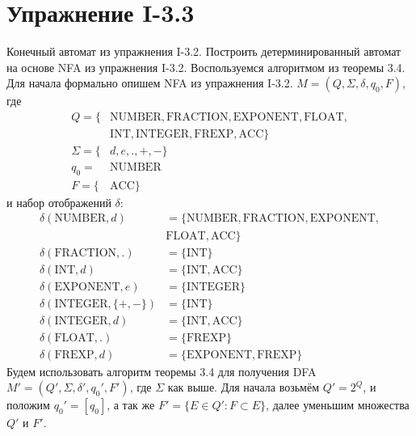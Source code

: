 \documentclass[12pt, oneside]{memoir}
\begin{document}
\section*{Упражнение I-3.3}
\begin{solution}
    {Конечный автомат из упражнения I-3.2.}
    {Построить детерминированный автомат на основе NFA из упражнения I-3.2.}
    {Воспользуемся алгоритмом из теоремы 3.4.}
    Для начала формально опишем NFA из упражнения I-3.2.
    $M = (Q, \Sigma, \delta, q_0, F)$, где
    \begin{align*}
        Q = \{          & \mathrm{NUMBER}, \mathrm{FRACTION}, \mathrm{EXPONENT}, \mathrm{FLOAT}, \\
                        & \mathrm{INT}, \mathrm{INTEGER}, \mathrm{FREXP}, \mathrm{ACC}\}         \\
        \Sigma = \{     & d, e, ., +, -\}                                                        \\
        q_0         ={} & \mathrm{NUMBER}                                                        \\
        F = \{          & \mathrm{ACC}\}
    \end{align*}
    и набор отображений $\delta$:
    \begin{align*}
        \delta(\mathrm{NUMBER}, d)         & = \{\mathrm{NUMBER}, \mathrm{FRACTION}, \mathrm{EXPONENT}, \\
                                           & \mathrm{FLOAT},  \mathrm{ACC}\}                            \\
        \delta(\mathrm{FRACTION}, .)       & = \{\mathrm{INT}\}                                         \\
        \delta(\mathrm{INT}, d)            & = \{\mathrm{INT}, \mathrm{ACC}\}                           \\
        \delta(\mathrm{EXPONENT}, e)       & = \{\mathrm{INTEGER} \}                                    \\
        \delta(\mathrm{INTEGER}, \{+, -\}) & = \{\mathrm{INT}\}                                         \\
        \delta(\mathrm{INTEGER}, d)        & = \{\mathrm{INT}, \mathrm{ACC}\}                           \\
        \delta(\mathrm{FLOAT}, .)          & = \{\mathrm{FREXP}\}                                       \\
        \delta(\mathrm{FREXP}, d)          & = \{\mathrm{EXPONENT}, \mathrm{FREXP}\}
    \end{align*}
    Будем использовать алгоритм теоремы 3.4 для получения DFA $M' = (Q', \Sigma, \delta', q_0', F')$, где $\Sigma$ как выше.
    Для начала возьмём $Q' = 2^Q$, и положим $q_0' = [q_0]$, а так же $F' = \{E \in Q' : F \subset E\}$, далее уменьшим множества $Q'$ и $F'$.


\end{solution}
\end{document}
